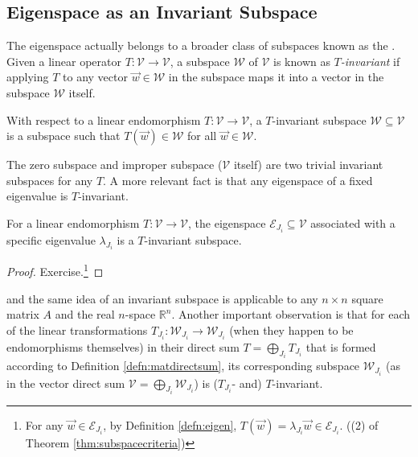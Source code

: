\subsection{Eigenspace as an Invariant Subspace}
The eigenspace actually belongs to a broader class of subspaces known as the . Given a linear operator $T: \mathcal{V} \to \mathcal{V}$, a subspace $\mathcal{W}$ of $\mathcal{V}$ is known as \textit{$T$-invariant} if applying $T$ to any vector $\vec{w} \in \mathcal{W}$ in the subspace maps it into a vector in the subspace $\mathcal{W}$ itself.
\begin{defn}
\label{defn:invariantsub}
With respect to a linear endomorphism $T: \mathcal{V} \to \mathcal{V}$, a $T$-invariant subspace $\mathcal{W} \subseteq \mathcal{V}$ is a subspace such that $T(\vec{w}) \in \mathcal{W}$ for all $\vec{w} \in \mathcal{W}$.
\end{defn}
The zero subspace and improper subspace ($\mathcal{V}$ itself) are two trivial invariant subspaces for any $T$. A more relevant fact is that any eigenspace of a fixed eigenvalue is $T$-invariant.
\begin{proper}
\label{proper:eigenTinvariant}
For a linear endomorphism $T: \mathcal{V} \to \mathcal{V}$, the eigenspace $\mathcal{E}_{J_i} \subseteq \mathcal{V}$ associated with a specific eigenvalue $\lambda_{J_i}$ is a $T$-invariant subspace.
\end{proper}
\begin{proof}
Exercise.\footnote{For any $\vec{w} \in \mathcal{E}_{J_i}$, by Definition \ref{defn:eigen}, $T(\vec{w}) = \lambda_{J_i} \vec{w} \in \mathcal{E}_{J_i}$. ((2) of Theorem \ref{thm:subspacecriteria})}
\end{proof}
and the same idea of an invariant subspace is applicable to any $n \times n$ square matrix $A$ and the real $n$-space $\mathbb{R}^n$. Another important observation is that for each of the linear transformations $T_{J_i}: \mathcal{W}_{J_i} \to \mathcal{W}_{J_i}$ (when they happen to be endomorphisms themselves) in their direct sum $T = \bigoplus_{J_i} T_{J_i}$ that is formed according to Definition \ref{defn:matdirectsum}, its corresponding subspace $\mathcal{W}_{J_i}$ (as in the vector direct sum $\mathcal{V} = \bigoplus_{J_i} \mathcal{W}_{J_i}$) is ($T_{J_i}$- and) $T$-invariant.

